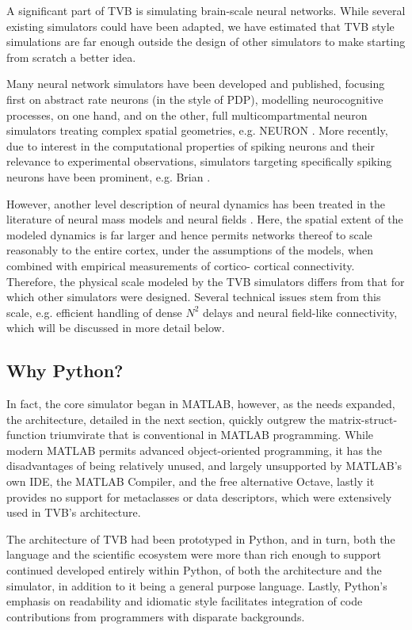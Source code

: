 A significant part of TVB is simulating brain-scale neural networks. While
several existing simulators could have been adapted, we have estimated that
TVB style simulations are far enough outside the design of other simulators to
make starting from scratch a better idea.

Many neural network simulators have been developed and published, focusing
first on abstract rate neurons (in the style of PDP), modelling neurocognitive
processes, on one hand, and on the other, full multicompartmental neuron
simulators treating complex spatial geometries, e.g. NEURON \cite{Hines_2001}.
More recently, due to interest in the computational properties of spiking 
neurons and their relevance to experimental observations, simulators targeting
specifically spiking neurons have been prominent, e.g. Brian 
\cite{Goodman_2009}.

However, another level description of neural dynamics has been treated
in the literature of neural mass models and neural fields 
\cite{Deco_2008a, Coombes_2010}. Here, the spatial
extent of the modeled dynamics is far larger and hence permits networks 
thereof to scale reasonably to the entire cortex, under the assumptions 
of the models, when combined with empirical measurements of cortico-
cortical connectivity. Therefore, the physical scale modeled by the TVB
simulators differs from that for which other simulators were designed.
Several technical issues stem from this scale, e.g. efficient handling
of dense $N^2$ delays and neural field-like connectivity, which will be
discussed in more detail below. 

\subsection{Why Python?}

In fact, the core simulator began in MATLAB, however, as the needs 
expanded, the architecture, detailed in the next section, quickly 
outgrew the matrix-struct-function triumvirate that is conventional
in MATLAB programming. While modern MATLAB permits advanced object-oriented
programming, it has the disadvantages of being relatively unused, and
largely unsupported by MATLAB's own IDE, the MATLAB Compiler, and the free
alternative Octave, lastly it provides no support for metaclasses or data
descriptors, which were extensively used in TVB's architecture.

The architecture of TVB had been prototyped in Python, and in turn, both the
language and the scientific ecosystem were more than rich enough to support
continued developed entirely within Python, of both the architecture and the
simulator, in addition to it being a general purpose language. Lastly, Python's
emphasis on readability and idiomatic style facilitates integration of 
code contributions from programmers with disparate backgrounds.

